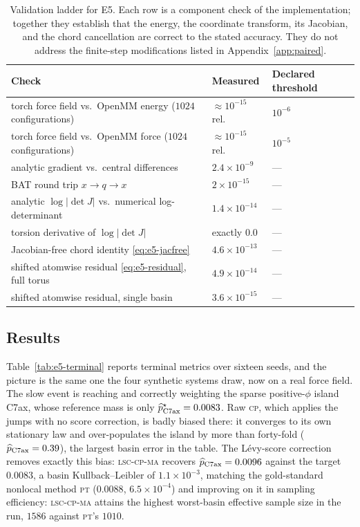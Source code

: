\documentclass[11pt]{article}
\begin{document}
\begin{table}[!ht]
\centering
\small
\setlength{\tabcolsep}{6pt}
\begin{tabular}{lll}
\toprule
Check & Measured & Declared threshold\\
\midrule
torch force field vs.\ OpenMM energy ($1024$ configurations)
  & $\approx10^{-15}$ rel. & $10^{-6}$\\
torch force field vs.\ OpenMM force ($1024$ configurations)
  & $\approx10^{-15}$ rel. & $10^{-5}$\\
analytic gradient vs.\ central differences & $2.4\times10^{-9}$ & ---\\
BAT round trip $x\to q\to x$              & $2\times10^{-15}$ & ---\\
analytic $\log|\det J|$ vs.\ numerical log-determinant
  & $1.4\times10^{-14}$ & ---\\
torsion derivative of $\log|\det J|$      & exactly $0.0$ & ---\\
Jacobian-free chord identity \eqref{eq:e5-jacfree}
  & $4.6\times10^{-13}$ & ---\\
shifted atomwise residual \eqref{eq:e5-residual}, full torus
  & $4.9\times10^{-14}$ & ---\\
shifted atomwise residual, single basin   & $3.6\times10^{-15}$ & ---\\
\bottomrule
\end{tabular}
\caption{Validation ladder for E5.  Each row is a component check of the
implementation; together they establish that the energy, the coordinate
transform, its Jacobian, and the chord cancellation are correct to the stated
accuracy.  They do not address the finite-step modifications listed in
Appendix~\ref{app:paired}.}
\label{tab:e5-validation}
\end{table}

\subsection{Results}
\label{app:e5-results}

Table~\ref{tab:e5-terminal} reports terminal metrics over sixteen seeds, and the
picture is the same one the four synthetic systems draw, now on a real force
field.  The slow event is reaching and correctly weighting the sparse
positive-$\phi$ island C7ax, whose reference mass is only
$\widehat p^\star_{\rm C7ax}=0.0083$.  Raw \textsc{cp}, which applies the jumps
with no score correction, is badly biased there: it converges to its own
stationary law and over-populates the island by more than forty-fold
($\widehat p_{\rm C7ax}=0.39$), the largest basin error in the table.  The
L\'evy-score correction removes exactly this bias: \textsc{lsc-cp-ma} recovers
$\widehat p_{\rm C7ax}=0.0096$ against the target $0.0083$, a basin
Kullback--Leibler of $1.1\times10^{-3}$, matching the gold-standard nonlocal
method \textsc{pt} ($0.0088$, $6.5\times10^{-4}$) and improving on it in
sampling efficiency: \textsc{lsc-cp-ma} attains the highest worst-basin
effective sample size in the run, $1586$ against \textsc{pt}'s $1010$.
\end{document}
